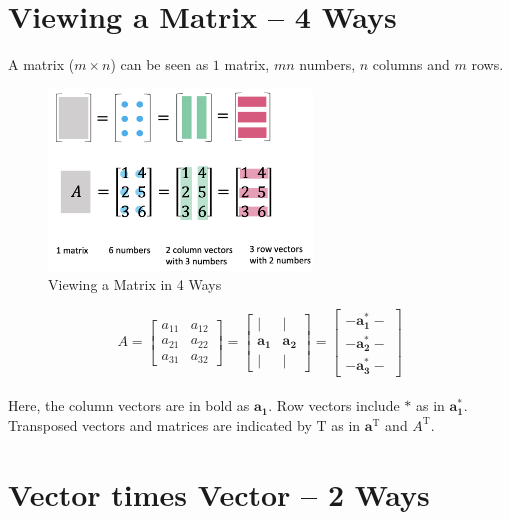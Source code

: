 \documentclass[letterpaper]{article}
\begin{document}
\tableofcontents

\section{Viewing a Matrix -- 4 Ways}

A matrix ($m \times n$) can be seen as $1$ matrix, $mn$ numbers, $n$ columns and $m$ rows.

\begin{figure}[H]
  \centering
  \includegraphics[keepaspectratio, width=7cm]{ViewingMatrix-4Ways.png}
  \caption{Viewing a Matrix in 4 Ways}
\end{figure}


\begin{equation*}
  A= \begin{bmatrix}
    a_{11} & a_{12}\\
    a_{21} & a_{22}\\
    a_{31} & a_{32}
  \end{bmatrix}
  =
  \begin{bmatrix}
    | & |\\
    \bm{a_1} & \bm{a_2}\\
    | & |
  \end{bmatrix}
  =
  \begin{bmatrix}
    - \bm{a_1^*} -\\
    - \bm{a_2^*} -\\
    - \bm{a_3^*} -
  \end{bmatrix}
\end{equation*} \\

Here, the column vectors are in bold as $\bm{a_1}$.
Row vectors include $\bm{*}$ as in $\bm{a_1^*}$.
Transposed vectors and matrices are indicated by $\mathrm{T}$ as
in $\bm{a}^{\mathrm{T}}$ and $A^{\mathrm{T}}$.


\section{Vector times Vector -- 2 Ways}
\end{document}
